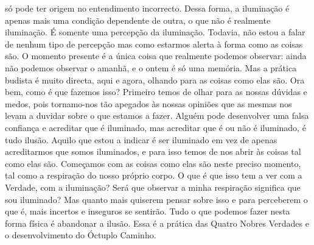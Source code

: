 só pode ter origem no entendimento incorrecto. Dessa forma,
a iluminação é apenas mais uma condição dependente de
outra, o que não é realmente iluminação. É somente uma percepção da iluminação. Todavia, não estou a falar de nenhum
tipo de percepção mas como estarmos alerta à forma como as
coisas são. O momento presente é a única coisa que realmente
podemos observar: ainda não podemos observar o amanhã, e
o ontem é só uma memória. Mas a prática budista é muito
directa, aqui e agora, olhando para as coisas como elas são.
Ora bem, como é que fazemos isso? Primeiro temos de
olhar para as nossas dúvidas e medos, pois tornamo-nos tão
apegados às nossas opiniões que as mesmas nos levam a duvidar sobre o que estamos a fazer. Alguém pode desenvolver
uma falsa confiança e acreditar que é iluminado, mas acreditar
que é ou não é iluminado, é tudo ilusão.
Aquilo que estou a indicar é ser iluminado em vez de
apenas acreditarmos que somos iluminados, e para isso temos
de nos abrir às coisas tal como elas são.
Começamos com as coisas como elas são neste preciso
momento, tal como a respiração do nosso próprio corpo. O
que é que isso tem a ver com a Verdade, com a iluminação?
Será que observar a minha respiração significa que sou
iluminado? Mas quanto mais quiserem pensar sobre isso e para
perceberem o que é, mais incertos e inseguros se sentirão.
Tudo o que podemos fazer nesta forma física é abandonar a ilusão. Essa é a prática das Quatro Nobres Verdades
e o desenvolvimento do Óctuplo Caminho.

